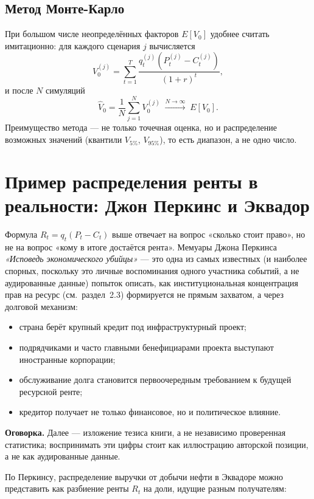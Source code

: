 \documentclass[11pt]{article}
\begin{document}
\subsection{Метод Монте-Карло}
При большом числе неопределённых факторов $E[V_0]$ удобнее считать имитационно: для каждого сценария $j$ вычисляется
\[
V_0^{(j)} = \sum_{t=1}^{T} \frac{q_t^{(j)}\left(P_t^{(j)} - C_t^{(j)}\right)}{(1+r)^t},
\]
и после $N$ симуляций
\[
\hat V_0 = \frac1N\sum_{j=1}^N V_0^{(j)} \;\xrightarrow{N\to\infty}\; E[V_0].
\]
Преимущество метода — не только точечная оценка, но и распределение возможных значений (квантили $V_{5\%}$, $V_{95\%}$), то есть диапазон, а не одно число.

\section{Пример распределения ренты в реальности: Джон Перкинс и Эквадор}
\label{sec:perkins}

Формула $R_t = q_t(P_t-C_t)$ выше отвечает на вопрос «сколько стоит право», но не на вопрос «кому в итоге достаётся рента». Мемуары Джона Перкинса \emph{«Исповедь экономического убийцы»} \cite{perkins2004confessions} — это одна из самых известных (и наиболее спорных, поскольку это личные воспоминания одного участника событий, а не аудированные данные) попыток описать, как институциональная концентрация прав на ресурс (см.\ раздел~2.3) формируется не прямым захватом, а через долговой механизм:
\begin{itemize}
\item страна берёт крупный кредит под инфраструктурный проект;
\item подрядчиками и часто главными бенефициарами проекта выступают иностранные корпорации;
\item обслуживание долга становится первоочередным требованием к будущей ресурсной ренте;
\item кредитор получает не только финансовое, но и политическое влияние.
\end{itemize}

\textbf{Оговорка.} Далее — изложение тезиса книги, а не независимо проверенная статистика; воспринимать эти цифры стоит как иллюстрацию авторской позиции, а не как аудированные данные.

По Перкинсу, распределение выручки от добычи нефти в Эквадоре можно представить как разбиение ренты $R_t$ на доли, идущие разным получателям:
\end{document}
